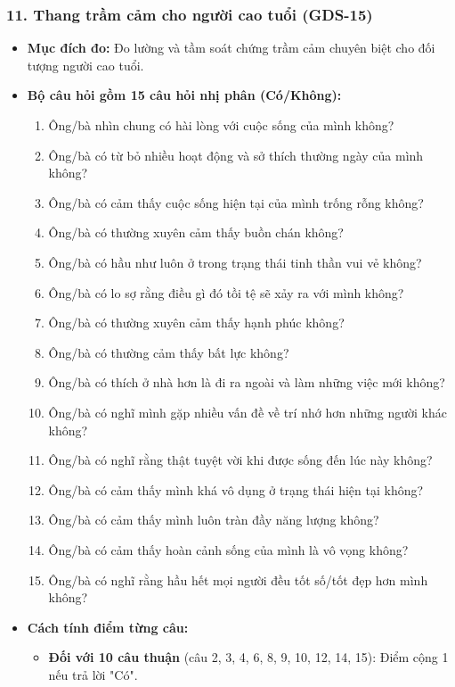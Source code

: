 \documentclass[12pt,a4paper]{article}
\begin{document}
\subsubsection*{11. Thang trầm cảm cho người cao tuổi (GDS-15)}
\begin{itemize}
    \item \textbf{Mục đích đo:} Đo lường và tầm soát chứng trầm cảm chuyên biệt cho đối tượng người cao tuổi.
    \item \textbf{Bộ câu hỏi gồm 15 câu hỏi nhị phân (Có/Không):}
    \begin{enumerate}
        \item Ông/bà nhìn chung có hài lòng với cuộc sống của mình không?
        \item Ông/bà có từ bỏ nhiều hoạt động và sở thích thường ngày của mình không?
        \item Ông/bà có cảm thấy cuộc sống hiện tại của mình trống rỗng không?
        \item Ông/bà có thường xuyên cảm thấy buồn chán không?
        \item Ông/bà có hầu như luôn ở trong trạng thái tinh thần vui vẻ không?
        \item Ông/bà có lo sợ rằng điều gì đó tồi tệ sẽ xảy ra với mình không?
        \item Ông/bà có thường xuyên cảm thấy hạnh phúc không?
        \item Ông/bà có thường cảm thấy bất lực không?
        \item Ông/bà có thích ở nhà hơn là đi ra ngoài và làm những việc mới không?
        \item Ông/bà có nghĩ mình gặp nhiều vấn đề về trí nhớ hơn những người khác không?
        \item Ông/bà có nghĩ rằng thật tuyệt vời khi được sống đến lúc này không?
        \item Ông/bà có cảm thấy mình khá vô dụng ở trạng thái hiện tại không?
        \item Ông/bà có cảm thấy mình luôn tràn đầy năng lượng không?
        \item Ông/bà có cảm thấy hoàn cảnh sống của mình là vô vọng không?
        \item Ông/bà có nghĩ rằng hầu hết mọi người đều tốt số/tốt đẹp hơn mình không?
    \end{enumerate}
    \item \textbf{Cách tính điểm từng câu:}
    \begin{itemize}
        \item \textbf{Đối với 10 câu thuận} (câu 2, 3, 4, 6, 8, 9, 10, 12, 14, 15): Điểm cộng 1 nếu trả lời "Có".

\end{itemize}
\end{itemize}
\end{document}
